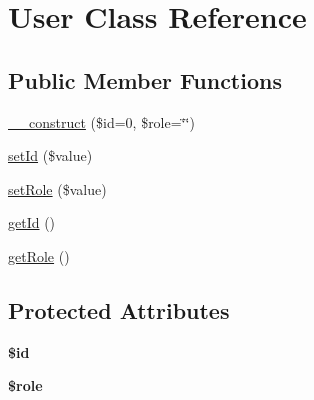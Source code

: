 \hypertarget{classUser}{\section{User Class Reference}
\label{classUser}
}
\subsection*{Public Member Functions}
\begin{DoxyCompactItemize}
\item 
\hyperlink{classUser_adb0101f8cfd611802617a78c04a6bda0}{\-\_\-\-\_\-construct} (\$id=0, \$role=\char`\"{}\char`\"{})
\item 
\hyperlink{classUser_a73a3de1fc55fc5fa1444effcb35fa0b7}{set\-Id} (\$value)
\item 
\hyperlink{classUser_ae06a7d79c33af2f6df0a4906add6c0ce}{set\-Role} (\$value)
\item 
\hyperlink{classUser_a39ad6e655fcc40623b9af2203cd7afa5}{get\-Id} ()
\item 
\hyperlink{classUser_a48631449aeb5aa95800fa8f3a17eac11}{get\-Role} ()
\end{DoxyCompactItemize}
\subsection*{Protected Attributes}
\begin{DoxyCompactItemize}
\item 
\hypertarget{classUser_a440b33833fb19a5caeb85b2e8eae3656}{{\bfseries \$id}}\label{classUser_a440b33833fb19a5caeb85b2e8eae3656}

\item 
\hypertarget{classUser_ab47cde807f0fcf85932226b162cb4520}{{\bfseries \$role}}\label{classUser_ab47cde807f0fcf85932226b162cb4520}

\end{DoxyCompactItemize}


